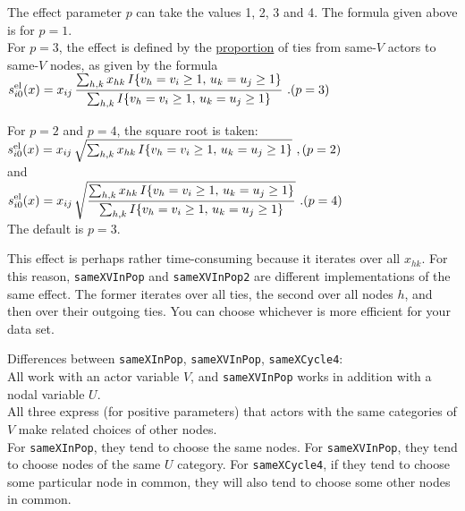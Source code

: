 \documentclass[a4paper,fleqn,11pt]{article}
\newcommand{\+}{\, + \,}
\newcommand{\vit}{\theenumi}
\newcounter{savenumi}
\begin{document}
\begin{enumerate}
 The effect parameter $p$ can take the values 1, 2, 3 and 4.
 The formula given above is for $p=1$.\\
 For $p=3$, the effect is defined by the \underline{proportion} of ties from same-$V$ actors
 to same-$V$ nodes, as given by the formula \\[0.5em]
 $\displaystyle s^{\rm el}_{i\vit}(x) =  x_{ij}\, \frac{ \sum_{h,k} x_{hk}\, I\{v_h = v_i \geq 1,\, u_k=u_j \geq 1\}}
            { \sum_{h,k} I\{v_h = v_i \geq 1,\, u_k=u_j \geq 1\}} \ . \hfill (p=3) $

 For $p=2$ and $p=4$, the square root is taken: \\[0.5em]
 $s^{\rm el}_{i\vit}(x) =  x_{ij}\, \sqrt{\sum_{h,k} x_{hk}\, I\{v_h = v_i \geq 1,\, u_k=u_j \geq 1 \}} \ ,
                 \hfill (p=2)$\\[0.3em]
 and \\[0.3em]
 $\displaystyle s^{\rm el}_{i\vit}(x) =  x_{ij}\, \sqrt{ \frac{ \sum_{h,k} x_{hk}\, I\{v_h = v_i \geq 1,\, u_k=u_j \geq 1 \}}
            { \sum_{h,k} I\{v_h = v_i \geq 1,\, u_k=u_j \geq 1 \}}}  \ . \hfill (p=4)$\\[0.3em]

The default is $p=3$.

This effect is perhaps rather time-consuming because it iterates over all $x_{hk}$.
For this reason, \texttt{sameXVInPop} and \texttt{sameXVInPop2} are different implementations
of the same effect.
The former iterates over all ties, the second over all nodes $h$, and then over their outgoing ties.
You can choose whichever is more efficient for your data set.


Differences between \texttt{sameXInPop}, \texttt{sameXVInPop}, \texttt{sameXCycle4}:\\
All work with an actor variable $V$, and \texttt{sameXVInPop} works in addition
with a nodal variable $U$.\\
All three express (for positive parameters) that actors with the same categories of $V$
make related choices of other nodes.\\
For \texttt{sameXInPop}, they tend to choose the same nodes.
For \texttt{sameXVInPop}, they tend to choose nodes of the same $U$ category.
For \texttt{sameXCycle4}, if they tend to choose some particular node in common,
they will also tend to choose some other nodes in common.



\setcounter{savenumi}{\value{enumi}}
\end{enumerate}
\end{document}
